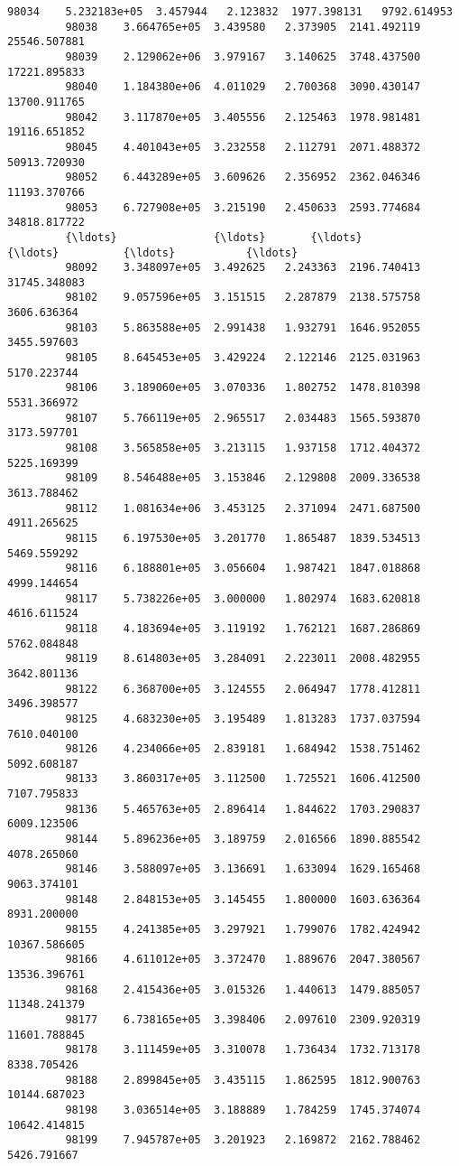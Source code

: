 \documentclass[11pt]{article}
\begin{document}
\begin{Verbatim}[commandchars=\\\{\}]
         98034    5.232183e+05  3.457944   2.123832  1977.398131   9792.614953   
         98038    3.664765e+05  3.439580   2.373905  2141.492119  25546.507881   
         98039    2.129062e+06  3.979167   3.140625  3748.437500  17221.895833   
         98040    1.184380e+06  4.011029   2.700368  3090.430147  13700.911765   
         98042    3.117870e+05  3.405556   2.125463  1978.981481  19116.651852   
         98045    4.401043e+05  3.232558   2.112791  2071.488372  50913.720930   
         98052    6.443289e+05  3.609626   2.356952  2362.046346  11193.370766   
         98053    6.727908e+05  3.215190   2.450633  2593.774684  34818.817722   
         {\ldots}               {\ldots}       {\ldots}        {\ldots}          {\ldots}           {\ldots}   
         98092    3.348097e+05  3.492625   2.243363  2196.740413  31745.348083   
         98102    9.057596e+05  3.151515   2.287879  2138.575758   3606.636364   
         98103    5.863588e+05  2.991438   1.932791  1646.952055   3455.597603   
         98105    8.645453e+05  3.429224   2.122146  2125.031963   5170.223744   
         98106    3.189060e+05  3.070336   1.802752  1478.810398   5531.366972   
         98107    5.766119e+05  2.965517   2.034483  1565.593870   3173.597701   
         98108    3.565858e+05  3.213115   1.937158  1712.404372   5225.169399   
         98109    8.546488e+05  3.153846   2.129808  2009.336538   3613.788462   
         98112    1.081634e+06  3.453125   2.371094  2471.687500   4911.265625   
         98115    6.197530e+05  3.201770   1.865487  1839.534513   5469.559292   
         98116    6.188801e+05  3.056604   1.987421  1847.018868   4999.144654   
         98117    5.738226e+05  3.000000   1.802974  1683.620818   4616.611524   
         98118    4.183694e+05  3.119192   1.762121  1687.286869   5762.084848   
         98119    8.614803e+05  3.284091   2.223011  2008.482955   3642.801136   
         98122    6.368700e+05  3.124555   2.064947  1778.412811   3496.398577   
         98125    4.683230e+05  3.195489   1.813283  1737.037594   7610.040100   
         98126    4.234066e+05  2.839181   1.684942  1538.751462   5092.608187   
         98133    3.860317e+05  3.112500   1.725521  1606.412500   7107.795833   
         98136    5.465763e+05  2.896414   1.844622  1703.290837   6009.123506   
         98144    5.896236e+05  3.189759   2.016566  1890.885542   4078.265060   
         98146    3.588097e+05  3.136691   1.633094  1629.165468   9063.374101   
         98148    2.848153e+05  3.145455   1.800000  1603.636364   8931.200000   
         98155    4.241385e+05  3.297921   1.799076  1782.424942  10367.586605   
         98166    4.611012e+05  3.372470   1.889676  2047.380567  13536.396761   
         98168    2.415436e+05  3.015326   1.440613  1479.885057  11348.241379   
         98177    6.738165e+05  3.398406   2.097610  2309.920319  11601.788845   
         98178    3.111459e+05  3.310078   1.736434  1732.713178   8338.705426   
         98188    2.899845e+05  3.435115   1.862595  1812.900763  10144.687023   
         98198    3.036514e+05  3.188889   1.784259  1745.374074  10642.414815   
         98199    7.945787e+05  3.201923   2.169872  2162.788462   5426.791667   
         

\end{Verbatim}
\end{document}
